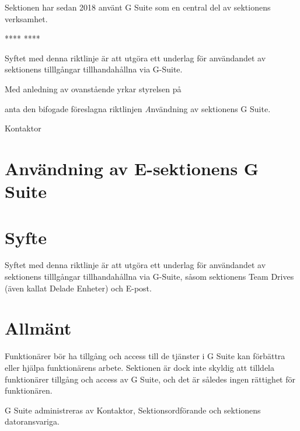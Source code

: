 \documentclass[../_main/handlingar.tex]{subfiles}
\begin{document}

Sektionen har sedan 2018 använt G Suite som en central del av sektionens verksamhet. 

****
****


Syftet med denna riktlinje är att utgöra ett underlag för användandet av sektionens tilllgångar tillhandahållna via G-Suite.

Med anledning av ovanstående yrkar styrelsen på

\begin{attsatser}
    
    \att anta den bifogade föreslagna riktlinjen {\textit Användning av sektionens G Suite}. 

\end{attsatser}

\begin{signatures}{1}
    \ist
    \signature{Mattias Lundström}{Kontaktor}
\end{signatures}

\section*{Användning av E-sektionens G Suite}
    \vspace{6px}

    \section{Syfte}
    \vspace{6px}
    
    Syftet med denna riktlinje är att utgöra ett underlag för användandet av sektionens tilllgångar tillhandahållna via G-Suite, såsom sektionens Team Drives (även kallat Delade Enheter) och E-post. 
    
    \vspace{6px}
    \section{Allmänt}
    \vspace{6px}

    Funktionärer bör ha tillgång och access till de tjänster i G Suite kan förbättra eller hjälpa funktionärens arbete. 
    Sektionen är dock inte skyldig att tilldela funktionärer tillgång och access av G Suite, och det är således ingen rättighet för funktionären. 
 
    G Suite administreras av Kontaktor, Sektionsordförande och sektionens datoransvariga. 
    
\end{document}
